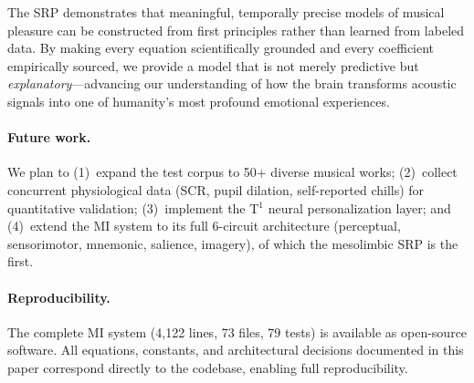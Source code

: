 \documentclass[10pt,twocolumn]{article}
\begin{document}
The SRP demonstrates that meaningful, temporally precise models of musical pleasure can be constructed from first principles rather than learned from labeled data. By making every equation scientifically grounded and every coefficient empirically sourced, we provide a model that is not merely predictive but \textit{explanatory}---advancing our understanding of how the brain transforms acoustic signals into one of humanity's most profound emotional experiences.

\paragraph{Future work.} We plan to (1)~expand the test corpus to 50+ diverse musical works; (2)~collect concurrent physiological data (SCR, pupil dilation, self-reported chills) for quantitative validation; (3)~implement the T$^1$ neural personalization layer; and (4)~extend the MI system to its full 6-circuit architecture (perceptual, sensorimotor, mnemonic, salience, imagery), of which the mesolimbic SRP is the first.

\paragraph{Reproducibility.} The complete MI system (4,122 lines, 73 files, 79 tests) is available as open-source software. All equations, constants, and architectural decisions documented in this paper correspond directly to the codebase, enabling full reproducibility.
\end{document}
